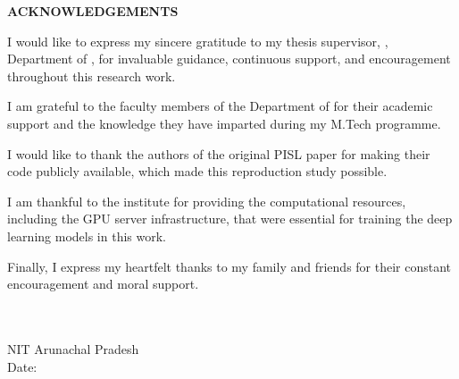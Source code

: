 \thispagestyle{plain}

\begin{center}
 \Large {\bf \uppercase{Acknowledgements}}
\end{center}

\vspace{3\baselineskip}

\noindent
I would like to express my sincere gratitude to my thesis supervisor, \textbf{\mysupervisor}, Department of \mydep, for invaluable guidance, continuous support, and encouragement throughout this research work.

\noindent
I am grateful to the faculty members of the Department of \mydep{} for their academic support and the knowledge they have imparted during my M.Tech programme.

\noindent
I would like to thank the authors of the original PISL paper for making their code publicly available, which made this reproduction study possible.

\noindent
I am thankful to the institute for providing the computational resources, including the GPU server infrastructure, that were essential for training the deep learning models in this work.

\noindent
Finally, I express my heartfelt thanks to my family and friends for their constant encouragement and moral support.

\noindent
\vspace{\baselineskip} \\
\textbf{\myname} \\
NIT Arunachal Pradesh \\
Date:
